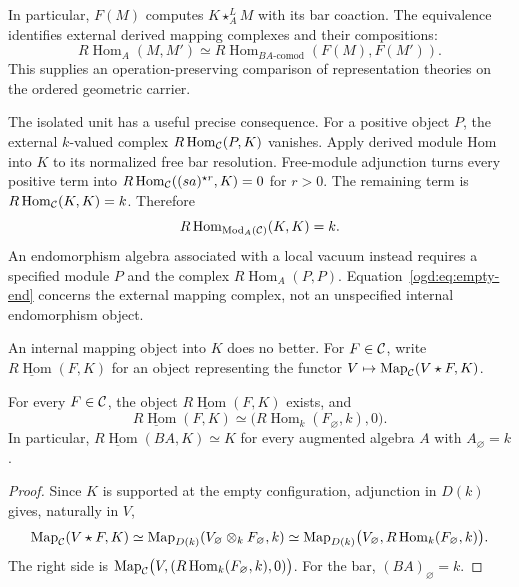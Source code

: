 In particular, \(F(M)\) computes \(K\star_A^L M\) with its bar coaction.
The equivalence identifies external derived mapping complexes and their compositions:
\[
 R\operatorname{Hom}_A(M,M')\simeq
 R\operatorname{Hom}_{BA\text{-comod}}(F(M),F(M')).
\]
This supplies an operation-preserving comparison of representation theories on the ordered geometric carrier.

The isolated unit has a useful precise consequence.
For a positive object \(P\), the external \(k\)-valued complex \(R\operatorname{Hom}_{\mathcal C}(P,K)\) vanishes.
Apply derived module Hom into \(K\) to its normalized free bar resolution.
Free-module adjunction turns every positive term into
\(R\operatorname{Hom}_{\mathcal C}((sa)^{\star r},K)=0\) for \(r>0\).
The remaining term is \(R\operatorname{Hom}_{\mathcal C}(K,K)=k\).
Therefore
\begin{equation}\label{ogd:eq:empty-end}
 R\operatorname{Hom}_{\operatorname{Mod}_A(\mathcal C)}(K,K)=k.
\end{equation}
An endomorphism algebra associated with a local vacuum instead requires a specified module \(P\) and the complex \(R\operatorname{Hom}_A(P,P)\).
Equation~\eqref{ogd:eq:empty-end} concerns the external mapping complex, not an unspecified internal endomorphism object.

An\label{ogd:def:internal-hom-to-empty-unit} internal mapping object into \(K\) does no better.
For \(F\in\mathcal C\), write \(\underline{R\operatorname{Hom}}(F,K)\) for an object representing the functor \(V\mapsto\operatorname{Map}_{\mathcal C}(V\star F,K)\).

\begin{proposition}\label{ogd:prop:internal-empty}
For every \(F\in\mathcal C\), the object \(\underline{R\operatorname{Hom}}(F,K)\) exists, and
\[
 \underline{R\operatorname{Hom}}(F,K)\simeq\bigl(R\operatorname{Hom}_k(F_\varnothing,k),0\bigr).
\]
In particular, \(\underline{R\operatorname{Hom}}(BA,K)\simeq K\) for every augmented algebra \(A\) with \(A_\varnothing=k\).
\end{proposition}
\begin{proof}
Since \(K\) is supported at the empty configuration, adjunction in \(D(k)\) gives, naturally in \(V\),
\[
 \operatorname{Map}_{\mathcal C}(V\star F,K)
 \simeq\operatorname{Map}_{D(k)}(V_\varnothing\otimes_kF_\varnothing,k)
 \simeq\operatorname{Map}_{D(k)}\bigl(V_\varnothing,R\operatorname{Hom}_k(F_\varnothing,k)\bigr).
\]
The right side is \(\operatorname{Map}_{\mathcal C}\bigl(V,(R\operatorname{Hom}_k(F_\varnothing,k),0)\bigr)\).
For the bar, \((BA)_\varnothing=k\).
\end{proof}

